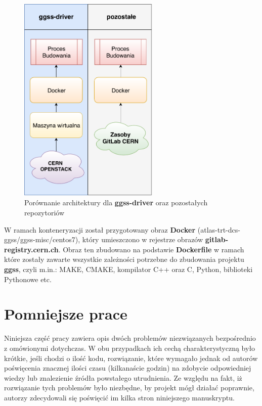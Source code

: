 \begin{figure}
\centering
\caption{Porównanie architektury dla \textbf{ggss-driver} oraz pozostałych repozytoriów}
\label{fig:buildComp}
\includegraphics[width=0.6\textwidth]{res/buildComp}
\end{figure}

W ramach konteneryzacji został przygotowany obraz \textbf{Docker} (atlas-trt-dcs-ggss/ggss-misc/centos7), który umieszczono w rejestrze obrazów \textbf{gitlab-registry.cern.ch}. Obraz ten zbudowano na podstawie \textbf{Dockerfile} w ramach które zostały zawarte wszystkie zależności potrzebne do zbudowania projektu \textbf{ggss}, czyli m.in.: MAKE, CMAKE, kompilator C++ oraz C, Python, biblioteki Pythonowe etc.


\newpage
\section{Pomniejsze prace}
Niniejsza część pracy zawiera opis dwóch problemów niezwiązanych bezpośrednio z omówionymi dotychczas. W obu przypadkach ich cechą charakterystyczną było krótkie, jeśli chodzi o ilość kodu, rozwiązanie, które wymagało jednak od autorów poświęcenia znacznej ilości czasu (kilkanaście godzin) na zdobycie odpowiedniej wiedzy lub znalezienie źródła powstałego utrudnienia. Ze względu na fakt, iż rozwiązanie tych problemów było niezbędne, by projekt mógł działać poprawnie, autorzy zdecydowali się poświęcić im kilka stron niniejszego manuskryptu.

